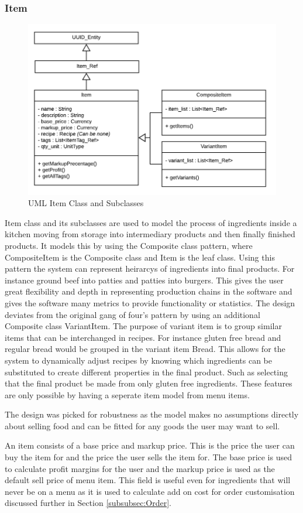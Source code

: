 \subsubsection{Item}
	\begin{figure}
		\centering
		\includegraphics[width=.6\linewidth]{images/data_model/item.png}
		\caption{UML Item Class and Subclasses}
	\end{figure}

	Item class and its subclasses are used to model the process of ingredients inside a kitchen moving from storage into intermediary products and then finally finished products. It models this by using the Composite class pattern, where CompositeItem is the Composite class and Item is the leaf class. Using this pattern the system can represent heirarcys of ingredients into final products. For instance ground beef into patties and patties into burgers. This gives the user great flexibility and depth in representing production chains in the software and gives the software many metrics to provide functionality or statistics. The design deviates from the original gang of four's pattern by using an additional Composite class VariantItem. The purpose of variant item is to group similar items that can be interchanged in recipes. For instance gluten free bread and regular bread would be grouped in the variant item Bread. This allows for the system to dynamically adjust recipes by knowing which ingredients can be substituted to create different properties in the final product. Such as selecting that the final product be made from only gluten free ingredients. These features are only possible by having a seperate item model from menu items.
	
	The design was picked for robustness as the model makes no assumptions directly about selling food and can be fitted for any goods the user may want to sell.
	
	An item consists of a base price and markup price. This is the price the user can buy the item for and the price the user sells the item for. The base price is used to calculate profit margins for the user and the markup price is used as the default sell price of menu item. This field is useful even for ingredients that will never be on a menu as it is used to calculate add on cost for order customisation discussed further in Section \ref{subsubsec:Order}.
	
